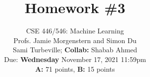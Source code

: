 \documentclass{article}
\date{{}}
\newcommand{\1}{\mathbf{1}}
\newcommand{\points}[1]{\small\textcolor{magenta}{\emph{[#1 point\ifthenelse{\equal{#1}{1}}{}{s}]}} \normalsize}
\newcounter{aprob}
\begin{document}
\setcounter{aprob}{0}
\title{Homework \#3}
\author{
    \normalsize{CSE 446/546: Machine Learning}\\
    \normalsize{Profs. Jamie Morgenstern and Simon Du}\\
    \normalsize{Sami Turbeville; \textbf{Collab:} Shabab Ahmed }\\
    \normalsize{Due: \textbf{Wednesday} November 17, 2021 11:59pm}\\
    \normalsize{\textbf{A:} 71 points, \textbf{B:} 15 points}
}
\date{{}}
\maketitle

\end{document}
